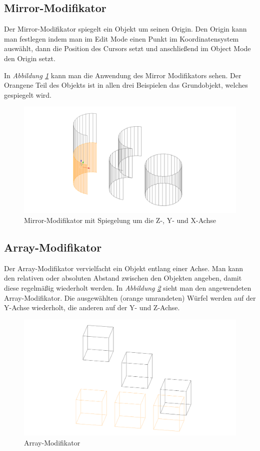 \subsection{Mirror-Modifikator}
\label{Mirror:heading}
Der Mirror-Modifikator spiegelt ein Objekt um seinen Origin.\citep{blender:mirror_modifier}
Den Origin kann man festlegen indem man im Edit Mode einen Punkt im Koordinatensystem auswählt, dann die Position des Cursors setzt
und anschließend im Object Mode den Origin setzt.

In \textit{Abbildung \ref{modifikatoren:image2}} kann man die Anwendung des Mirror Modifikators sehen. Der Orangene Teil des Objekts ist in allen drei Beispielen das
Grundobjekt, welches gespiegelt wird.

\begin{figure}[h]
    \centering
    \includegraphics[width=.8\textwidth]{images/Modifikatoren-Mirror.png}
    \caption{Mirror-Modifikator mit Spiegelung um die Z-, Y- und X-Achse}
    \label{modifikatoren:image2}
\end{figure}

\subsection{Array-Modifikator}
\label{Array:heading}
Der Array-Modifikator vervielfacht ein Objekt entlang einer Achse. Man kann den relativen oder absoluten Abstand zwischen den Objekten
angeben, damit diese regelmäßig wiederholt werden.\citep{blender:array_modifier} In \textit{Abbildung \ref{modifikatoren:image3}} sieht man den angewendeten Array-Modifikator.
Die ausgewählten (orange umrandeten) Würfel werden auf der Y-Achse
wiederholt, die anderen auf der Y- und Z-Achse.
\begin{figure}[h]
    \centering
    \includegraphics[width=.8\textwidth]{images/Modifikatoren-Array.png}
    \caption{Array-Modifikator}
    \label{modifikatoren:image3}
\end{figure}

